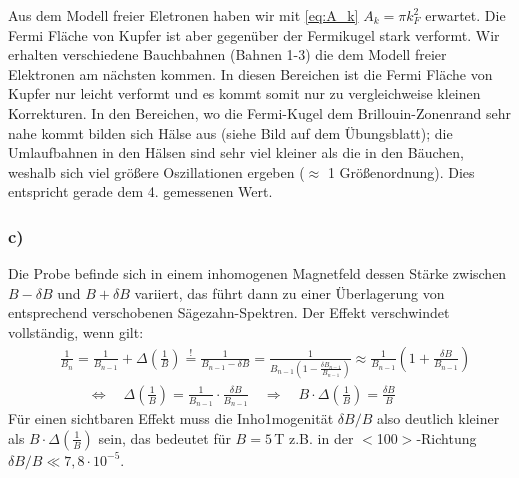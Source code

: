 Aus dem Modell freier Eletronen haben wir mit \eqref{eq:A_k} $A_k = \pi k_F^2$ erwartet.
Die Fermi Fläche von Kupfer ist aber gegenüber der Fermikugel stark verformt.
Wir erhalten verschiedene Bauchbahnen (Bahnen 1-3) die dem Modell freier Elektronen am nächsten kommen.
In diesen Bereichen ist die Fermi Fläche von Kupfer nur leicht
verformt und es kommt somit nur zu vergleichweise kleinen Korrekturen.
In den Bereichen, wo die Fermi-Kugel dem Brillouin-Zonenrand sehr nahe kommt bilden sich
Hälse aus (siehe Bild auf dem Übungsblatt); die Umlaufbahnen in den Hälsen sind
sehr viel kleiner als die in den Bäuchen, weshalb sich viel größere Oszillationen ergeben
($\approx$ 1 Größenordnung). Dies entspricht gerade dem 4. gemessenen Wert.

\subsubsection*{c)}
Die Probe befinde sich in einem inhomogenen Magnetfeld dessen Stärke zwischen
$B - \delta B$ und $B + \delta B$ variiert, das führt dann zu einer Überlagerung
von entsprechend verschobenen Sägezahn-Spektren. Der Effekt verschwindet vollständig,
wenn gilt:
\begin{align*}
  & \frac{1}{B_n} = \frac{1}{B_{n-1}} +  \Delta \left(\frac 1B\right) \overset{!}=
  \frac{1}{B_{n-1} - \delta B} = \frac{1}{B_{n-1} \left(1 - \frac{\delta B_{n-1}}{B_{n-1}}\right)}
  \approx \frac{1}{B_{n-1}} \left(1  + \frac{\delta B}{B_{n-1}} \right)\\
  & \qquad \Leftrightarrow \quad \Delta \left(\frac 1B\right) =
    \frac{1}{B_{n-1}} \cdot \frac{\delta B}{B_{n-1}}
    \quad \Rightarrow \quad B \cdot \Delta \left(\frac 1B\right) = \frac{\delta B}{B}
\end{align*}
Für einen sichtbaren Effekt muss die Inho1mogenität $\delta B / B$ also deutlich
kleiner als $B \cdot \Delta \left(\frac 1B\right)$ sein, das bedeutet für
$B=5\,$T z.B. in der $<$100$>$-Richtung $\delta B / B \ll 7{,}8 \cdot 10^{-5}$.

